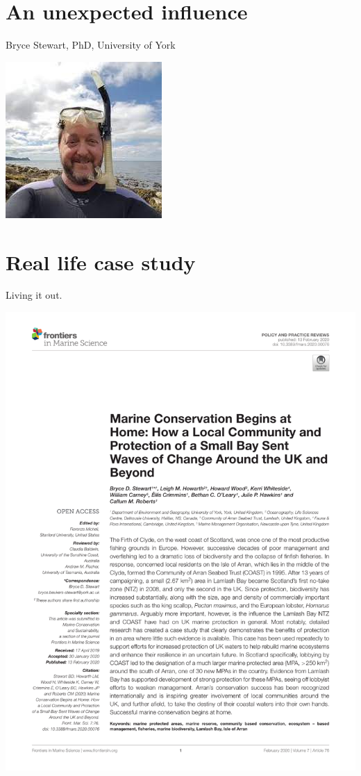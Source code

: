\documentclass[
]{book}
\begin{document}
\hypertarget{an-unexpected-influence}{%
\chapter{An unexpected influence}\label{an-unexpected-influence}}

Bryce Stewart, PhD, University of York

\begin{center}\includegraphics{_images/bryce} \end{center}

\hypertarget{real-life-case-study}{%
\chapter{Real life case study}\label{real-life-case-study}}

Living it out.

\begin{center}\includegraphics{_images/marine} \end{center}
\end{document}
